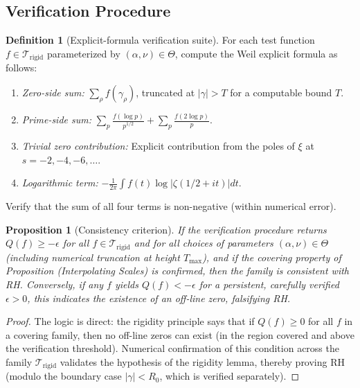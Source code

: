 \documentclass[11pt]{article}
\theoremstyle{plain}
\newtheorem{proposition}[theorem]{Proposition}
\theoremstyle{definition}
\newtheorem{definition}[theorem]{Definition}
\theoremstyle{remark}
\begin{document}
\subsection{Verification Procedure}

\begin{definition}[Explicit-formula verification suite]
For each test function $f\in\mathcal{T}_{\mathrm{rigid}}$ parameterized by $(\alpha,\nu)\in\Theta$,
compute the Weil explicit formula as follows:
\begin{enumerate}
  \item \emph{Zero-side sum:} $\sum_{\rho} f(\gamma_\rho)$, truncated at $|\gamma|>T$ for a computable bound $T$.
  \item \emph{Prime-side sum:} $\sum_p \frac{f(\log p)}{p^{1/2}} + \sum_p \frac{f(2\log p)}{p}$.
  \item \emph{Trivial zero contribution:} Explicit contribution from the poles of $\xi$ at $s=-2,-4,-6,\ldots$.
  \item \emph{Logarithmic term:} $-\frac{1}{2\pi}\int f(t)\log|\zeta(1/2+it)| dt$.
\end{enumerate}
Verify that the sum of all four terms is non-negative (within numerical error).
\end{definition}

\begin{proposition}[Consistency criterion]
If the verification procedure returns $Q(f)\ge -\epsilon$ for all $f\in\mathcal{T}_{\mathrm{rigid}}$
and for all choices of parameters $(\alpha,\nu)\in\Theta$ (including numerical truncation at height $T_{\max}$),
and if the covering property of Proposition (Interpolating Scales) is confirmed,
then the family is consistent with RH.
Conversely, if any $f$ yields $Q(f)<-\epsilon$ for a persistent, carefully verified $\epsilon>0$,
this indicates the existence of an off-line zero, falsifying RH.
\end{proposition}

\begin{proof}
The logic is direct: the rigidity principle says that if $Q(f)\ge 0$ for all $f$ in a covering family,
then no off-line zeros can exist (in the region covered and above the verification threshold).
Numerical confirmation of this condition across the family $\mathcal{T}_{\mathrm{rigid}}$ validates the hypothesis of the rigidity lemma,
thereby proving RH (modulo the boundary case $|\gamma|<R_0$, which is verified separately).
\end{proof}
\end{document}
